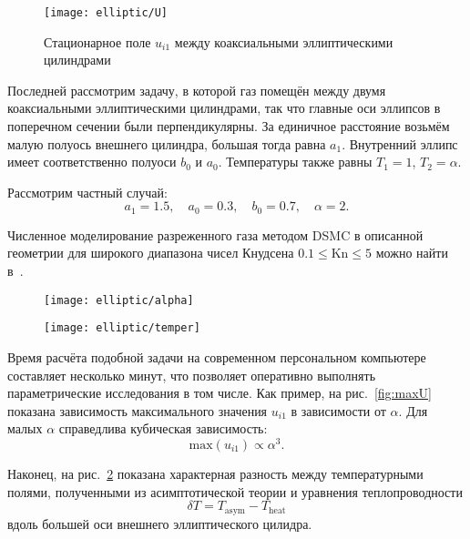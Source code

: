 \documentclass[english,russian,a4paper,10pt]{article}
\newcommand{\Kn}{\mathrm{Kn}}
\begin{document}
\begin{figure}
	\centering
	\texttt{[image: elliptic/U]}
	\caption{Стационарное поле \(u_{i1}\) между коаксиальными эллиптическими цилиндрами}
	\label{fig:elliptic}
\end{figure}

Последней рассмотрим задачу, в которой газ помещён между двумя коаксиальными эллиптическими цилиндрами,
так что главные оси эллипсов в поперечном сечении были перпендикулярны.
За единичное расстояние возьмём малую полуось внешнего цилиндра, большая тогда равна \(a_1\).
Внутренний эллипс имеет соответственно полуоси \(b_0\) и \(a_0\).
Температуры также равны \(T_1=1\), \(T_2=\alpha\).

Рассмотрим частный случай:
\[ a_1 = 1.5, \quad a_0 = 0.3, \quad b_0 = 0.7, \quad \alpha = 2.\]

Численное моделирование разреженного газа методом DSMC в описанной геометрии
для широкого диапазона чисел Кнудсена \(0.1\le\Kn\le5\) можно найти в~\cite{Sone1998}.

\begin{figure}[ht]
	\centering
	\begin{minipage}{.48\textwidth}
		\centering
		\texttt{[image: elliptic/alpha]}
		\label{fig:maxU}
	\end{minipage}
	\quad
	\begin{minipage}{.48\textwidth}
		\centering
		\texttt{[image: elliptic/temper]}
 		\vspace{-11pt}
		\label{fig:deltaT}
	\end{minipage}
\end{figure}

Время расчёта подобной задачи на современном персональном компьютере составляет несколько минут,
что позволяет оперативно выполнять параметрические исследования в том числе. Как пример,
на рис.~\ref{fig:maxU} показана зависимость максимального значения \(u_{i1}\) в зависимости от \(\alpha\).
Для малых \(\alpha\) справедлива кубическая зависимость:
\begin{equation}
	\mathrm{max}(u_{i1}) \propto \alpha^3.
\end{equation}

Наконец, на рис.~\ref{fig:deltaT} показана характерная разность между температурными полями,
полученными из асимптотической теории и уравнения теплопроводности
\[ \delta T = T_\mathrm{asym} - T_\mathrm{heat} \]
вдоль большей оси внешнего эллиптического цилидра.
\end{document}
